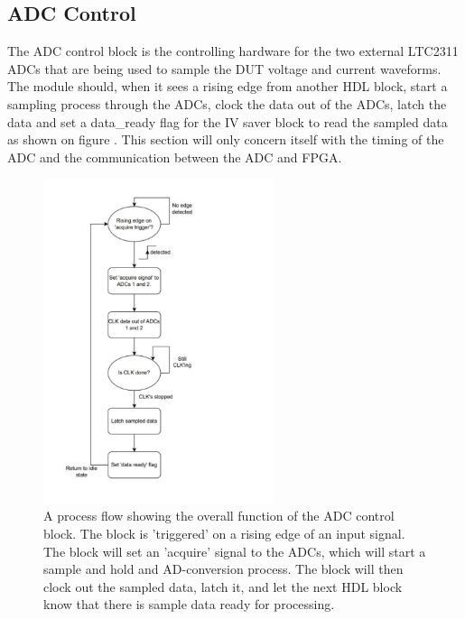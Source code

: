 \subsection{ADC Control} \label{subsec:ADC_CONTROL} 

The ADC control block is the controlling hardware for the two external LTC2311\cite{ADC_LTC2311} ADCs that are being used to sample the DUT voltage and current waveforms. The module should, when it sees a rising edge from another HDL block, start a sampling process through the ADCs, clock the data out of the ADCs, latch the data and set a data\_ready flag for the IV saver block to read the sampled data as shown on figure . This section will only concern itself with the timing of the ADC and the communication between the ADC and FPGA.

\begin{figure}[H]
    \centering
    \includegraphics[clip, trim=0 0 0 0, width=0.6\textwidth]{Sections/7_SystemDesign/Figures/7_2_8_ADCControlOverallSignals_cropped.pdf}
    \caption{A process flow showing the overall function of the ADC control block. The block is 'triggered' on a rising edge of an input signal. The block will set an 'acquire' signal to the ADCs, which will start a sample and hold and AD-conversion process. The block will then clock out the sampled data, latch it, and let the next HDL block know that there is sample data ready for processing.}
    \label{fig:7_2_8_ADCControlProcess}
\end{figure}

